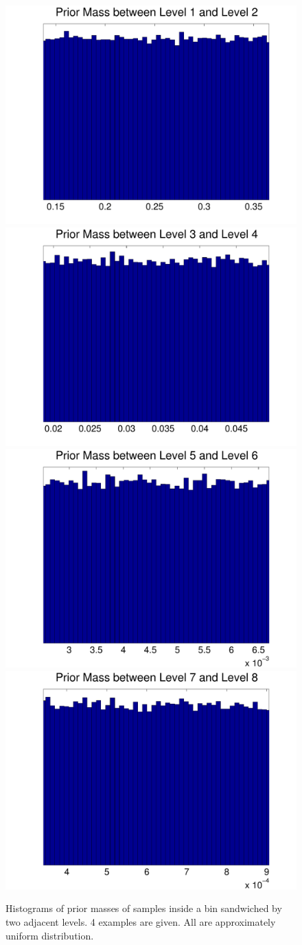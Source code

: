\documentclass[letterpaper, preprint]{aastex}
\begin{document}
\begin{figure}[h]
 \includegraphics[width=0.45\linewidth]{histgaps-01-02.pdf}
 \includegraphics[width=0.45\linewidth]{histgaps-03-04.pdf}\\
 \includegraphics[width=0.45\linewidth]{histgaps-05-06.pdf}
 \includegraphics[width=0.45\linewidth]{histgaps-07-08.pdf} \\
\caption{Histograms of prior masses of samples inside a bin sandwiched by two adjacent levels. 4 examples are given. All are approximately uniform distribution.}
 \label{fig:hist-gaps}
\end{figure}
\end{document}
